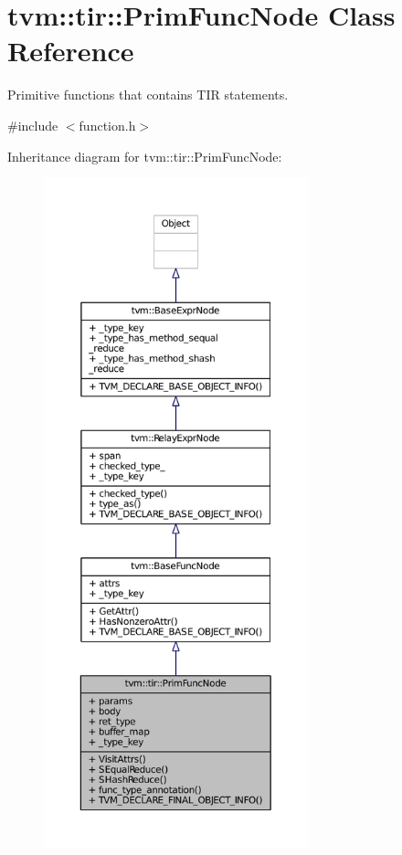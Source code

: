 \hypertarget{classtvm_1_1tir_1_1PrimFuncNode}{}\section{tvm\+:\+:tir\+:\+:Prim\+Func\+Node Class Reference}
\label{classtvm_1_1tir_1_1PrimFuncNode}


Primitive functions that contains T\+IR statements.  




{\ttfamily \#include $<$function.\+h$>$}



Inheritance diagram for tvm\+:\+:tir\+:\+:Prim\+Func\+Node\+:
\nopagebreak
\begin{figure}[H]
\begin{center}
\leavevmode
\includegraphics[height=550pt]{classtvm_1_1tir_1_1PrimFuncNode__inherit__graph}
\end{center}
\end{figure}


